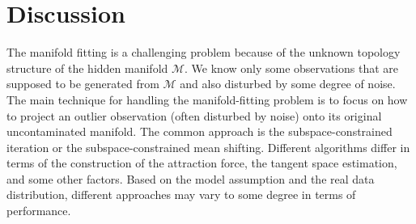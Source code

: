\documentclass[aos,preprint]{imsart}
\theoremstyle{remark}
\begin{document}
\section{Discussion}
The manifold fitting is a challenging problem because of the unknown topology structure of the hidden manifold $\mathcal M$. We know only some observations that are supposed to be generated from $\mathcal M$ and also disturbed by some degree of noise. The main technique for handling the manifold-fitting problem is to focus on how to project an outlier observation (often disturbed by noise) onto its original uncontaminated manifold. The common approach is the subspace-constrained iteration or the subspace-constrained mean shifting.
Different algorithms differ in terms of the construction of the attraction force, the tangent space estimation, and some other factors. Based on the model assumption and the real data distribution, different approaches may vary to some degree in terms of performance.
\end{document}

